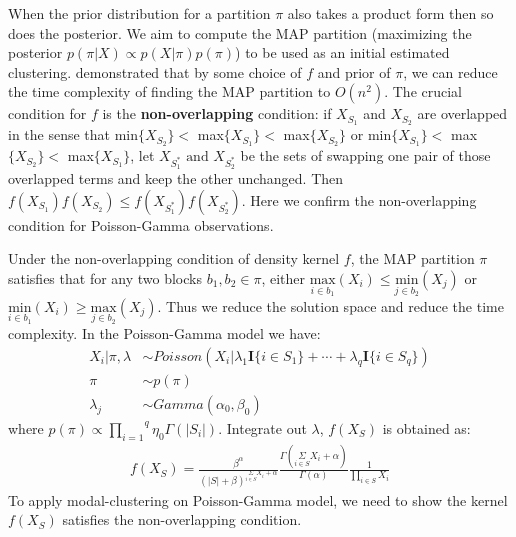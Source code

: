\documentclass[aoas,preprint]{imsart}
\begin{document}
When the prior distribution for a partition $\pi$  also takes a product form then so does the
posterior.  We aim to compute
the MAP partition (maximizing the posterior $p(\pi | X) \propto p(X|\pi) p(\pi)$) to be used
as an initial  estimated clustering.
\cite{ref:dahl} demonstrated that by some choice of $f$ and prior of $\pi$, we can reduce the time complexity of finding the MAP partition to $O(n^2)$.
The crucial condition for $f$ is the \textbf{non-overlapping} condition:
if $X_{S_1}$ and $X_{S_2}$ are overlapped in the sense that  min$\{X_{S_2}\}  <$ max$\{X_{S_1}\}  <$ max$\{X_{S_2}\}$ or min$\{X_{S_1}\}  <$ max$\{X_{S_2}\}  <$ max$\{X_{S_1}\}$, 
let $X_{S_1^*} \text{ and } X_{S_2^*}$ be the sets of swapping one pair of those overlapped terms and keep the other unchanged. Then $f(X_{S_1}) f(X_{S_2}) \leq f(X_{S_1^*}) f(X_{S_2^*})$. Here we 
confirm the non-overlapping condition for Poisson-Gamma observations.

Under the non-overlapping condition of density kernel $f$, 
the MAP partition $\pi$ satisfies 
that for any two blocks $b_1, b_2 \in \pi$, either $\underset{i \in b_1}{\text{max}}(X_i) \leq \underset{j\in b_2}{\text{min}}(X_j)$ or $\underset{i \in b_1}{\text{min}}(X_i) \geq \underset{j\in b_2}{\text{max}}(X_j)$. Thus we reduce the solution space and reduce the time complexity.
In the Poisson-Gamma model we have:
\begin{align*}
X_i | \pi, \lambda &\sim Poisson(X_i | \lambda_1\textbf{I}\{i\in S_1\} + \cdots + \lambda_q\textbf{I}\{i \in S_q\})\\
\pi &\sim p(\pi)\\
\lambda_j &\sim Gamma(\alpha_0, \beta_0)
\end{align*}
where $p(\pi)\propto \overset{q}{\underset{i = 1}{\prod}}\eta_0\Gamma(|S_i|)$. Integrate out $\lambda$, $f(X_{S})$ is obtained as:
\begin{eqnarray*}
f(X_{S}) = \frac{\beta^\alpha}{(|S| + \beta)^{\underset{i \in S}{\Sigma} X_i + \alpha}} \frac{\Gamma(\underset{i \in S}{\Sigma} X_i  + \alpha)}{\Gamma(\alpha)} \frac{1}{\underset{i \in S}{\prod }X_i}
\end{eqnarray*}
To apply modal-clustering on Poisson-Gamma model, we need to show the kernel $f(X_S)$ satisfies the 
non-overlapping condition.
\end{document}
